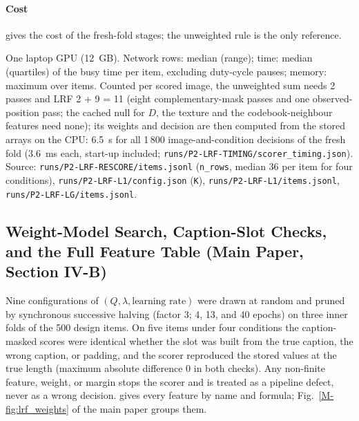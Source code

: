 \documentclass[journal,onecolumn]{IEEEtran}
\theoremstyle{plain}
\begin{document}
\paragraph*{Cost}
 gives the cost of the fresh-fold stages; the unweighted rule is the only reference.

\begin{table}[!htbp]
\centering
\caption{Cost per Item of the Fresh-Fold Stages}
\label{stab:cost2}
\footnotesize
\resizebox{\textwidth}{!}{}

\vspace{2pt}
\parbox{0.9\textwidth}{\scriptsize One laptop GPU (12~GB). Network rows: median (range); time: median (quartiles) of the busy time per item, excluding duty-cycle pauses; memory: maximum over items. Counted per scored image, the unweighted sum needs 2 passes and LRF 2 + 9 = 11 (eight complementary-mask passes and one observed-position pass; the cached null for $D$, the texture and the codebook-neighbour features need none); its weights and decision are then computed from the stored arrays on the CPU: 6.5~s for all 1\,800 image-and-condition decisions of the fresh fold (3.6~ms each, start-up included; \nolinkurl{runs/P2-LRF-TIMING/scorer_timing.json}).
Source: \nolinkurl{runs/P2-LRF-RESCORE/items.jsonl} (\nolinkurl{n_rows}, median 36 per item for four conditions), \nolinkurl{runs/P2-LRF-L1/config.json} (\nolinkurl{K}), \nolinkurl{runs/P2-LRF-L1/items.jsonl}, \nolinkurl{runs/P2-LRF-LG/items.jsonl}.}
\end{table}

\subsection{Weight-Model Search, Caption-Slot Checks, and the Full Feature Table (Main Paper, Section IV-B)}\label{sup:lrfdetail}
Nine configurations of $(Q,\lambda,\text{learning rate})$ were drawn at random and pruned by synchronous successive halving (factor 3; 4,
13, and 40 epochs) on three inner folds of the 500 design items.
On five items under four conditions the caption-masked scores were identical whether the slot was built from the true caption, the wrong
caption, or padding, and the scorer reproduced the stored values at the true length (maximum absolute difference 0 in both checks).
Any non-finite feature, weight, or margin stops the scorer and is treated as a pipeline defect, never as a wrong decision.
 gives every feature by name and formula; Fig.~\ref{M-fig:lrf_weights} of the main paper groups them.
\end{document}
